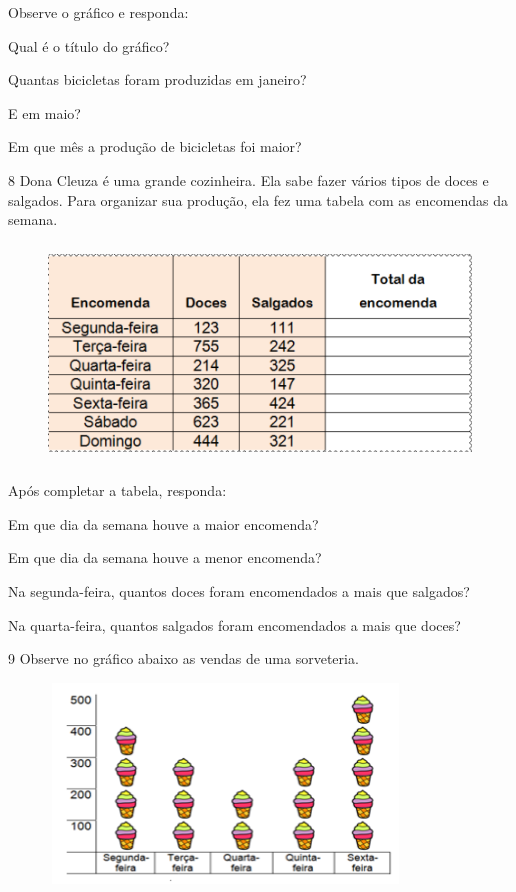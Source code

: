 Observe o gráfico e responda:

\begin{escolha}
\item Qual é o título do gráfico? 
\item Quantas bicicletas foram produzidas em janeiro? 
\item E em maio? 
\item Em que mês a produção de bicicletas foi maior? 
\end{escolha}

\num{8}  Dona Cleuza é uma grande cozinheira. Ela sabe fazer vários tipos de
doces e salgados. Para organizar sua produção, ela fez uma tabela com as
encomendas da semana.

\begin{figure}
\includegraphics[width=4.88403in,height=2.27917in]{./imgSAEB_6_MAT/media/image86.png}
\end{figure}

Após completar a tabela, responda:

\begin{escolha}
\item Em que dia da semana houve a maior encomenda? 
\item Em que dia da semana houve a menor encomenda? 
\item Na segunda-feira, quantos doces foram encomendados a mais que salgados? 
\item Na quarta-feira, quantos salgados foram encomendados a mais que doces? 
\end{escolha}

\num{9}  Observe no gráfico abaixo as vendas de uma sorveteria.

\begin{figure}
\includegraphics[width=3.7in,height=2.1in]{./imgSAEB_6_MAT/media/image87.png}
\end{figure}

